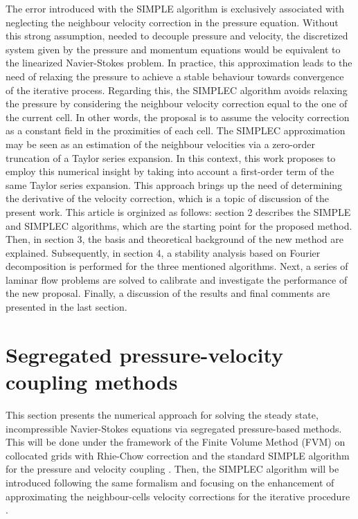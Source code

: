 \documentclass[final,3p,times,11pt,onecolumn]{myElsarticle}
\numberwithin{equation}{section}
\begin{document}
The error introduced with the SIMPLE algorithm is exclusively associated with neglecting the neighbour velocity correction in the pressure equation. Without this strong assumption, needed to decouple pressure and velocity, the discretized system given by the pressure and momentum equations would be equivalent to the linearized Navier-Stokes problem. In practice, this approximation leads to the need of relaxing the pressure to achieve a stable behaviour towards convergence of the iterative process. Regarding this, the SIMPLEC algorithm avoids relaxing the pressure by considering the neighbour velocity correction equal to the one of the current cell. In other words, the proposal is to assume the velocity correction as a constant field in the proximities of each cell. The SIMPLEC approximation may be seen as an estimation of the neighbour velocities via a zero-order truncation of a Taylor series expansion. In this context, this work proposes to employ this numerical insight by taking into account a first-order term of the same Taylor series expansion. This approach brings up the need of determining the derivative of the velocity correction, which is a topic of discussion of the present work. This article is orginized as follows: section 2 describes the SIMPLE and SIMPLEC algorithms, which are the starting point for the proposed method. Then, in section 3, the basis and theoretical background of the new method are explained. Subsequently, in section 4, a stability analysis based on Fourier decomposition is performed for the three mentioned algorithms. Next, a series of laminar flow problems are solved to calibrate and investigate the performance of the new proposal. Finally, a discussion of the results and final comments are presented in the last section.

\section{Segregated pressure-velocity coupling methods} \label{sec:theory}

This section presents the numerical approach for solving the steady state, incompressible Navier-Stokes equations via segregated pressure-based methods. This will be done under the framework of the Finite Volume Method (FVM) on collocated grids with Rhie-Chow correction \cite{rhiechow} and the standard SIMPLE algorithm for the pressure and velocity coupling \cite{patankar1972}. Then, the SIMPLEC algorithm will be introduced \cite{vanDoormal} following the same formalism and focusing on the enhancement of approximating the neighbour-cells velocity corrections for the iterative procedure \cite{moukalled}.
\end{document}
